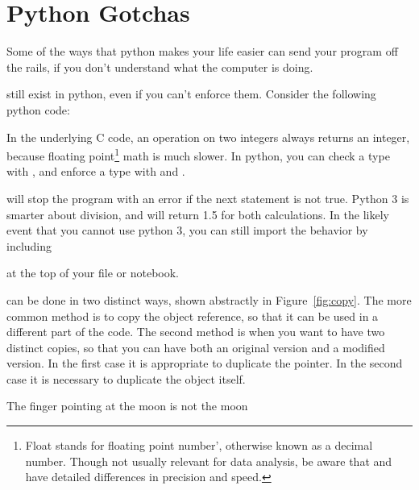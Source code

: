 \documentclass[justified, nobib]{tufte-handout}
\newcommand{\floatNote}{\footnote{ Float stands for floating
  point number', otherwise known as a decimal number.
  Though not usually relevant for data analysis, be aware that
  \ipythoninline{int} and \ipythoninline{float} have detailed differences in
  precision and speed.}}
\begin{document}
\section*{Python Gotchas}
Some of the ways that python makes your life easier can send your program off
the rails, if you don't understand what the computer is doing.

 still exist in python, even if you can't enforce
them. Consider the following python code:
\begin{adjustwidth}{2.0em}{0pt}

\end{adjustwidth}

\noindent
In the underlying C code, an operation on two integers always returns an
integer, because floating point\floatNote{} \;math is much slower. In python,
you can check a type with , and enforce a
type with  and .
\begin{adjustwidth}{2.0em}{0pt}

\end{adjustwidth}
 will stop the program with an error if the next
statement is not true.
Python 3 is smarter about division, and will return 1.5 for both calculations.
In the likely event that you cannot use python 3, you can still
import the behavior by including
\begin{adjustwidth}{2.0em}{0pt}

\end{adjustwidth}
at the top of your file or notebook.

 can be done in two distinct ways, shown abstractly
in Figure~\ref*{fig:copy}. The more common method is to copy the object
reference, so that it can be used in a different part of the code. The second
method is when you want to have two distinct copies, so that you can have both
an original version and a modified version. In the first case it is appropriate
to duplicate the pointer. In the second case it is necessary to duplicate the
object itself.


\smallskip
\begin{marginfigure}
    \vspace*{\fill}
    \centering
    \subfloat[Case 1]{\scalebox{1}{}}

    \vfill

    \subfloat[Case 2]{\scalebox{0.69}{}}
  \caption{The finger pointing at the moon is not the moon}
\label{fig:copy}
\end{marginfigure}
\end{document}
